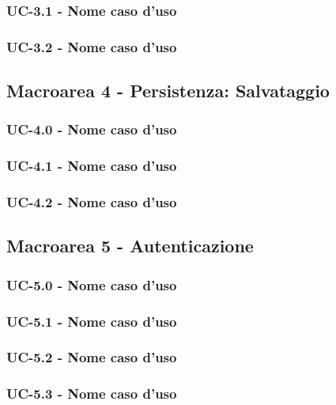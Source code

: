 \documentclass[11pt,a4paper]{article}
\begin{document}
\subsubsection{UC-3.1 - Nome caso d'uso}

\subsubsection{UC-3.2 - Nome caso d'uso}


\subsection{Macroarea 4 - Persistenza: Salvataggio}
\subsubsection{UC-4.0 - Nome caso d'uso}

\subsubsection{UC-4.1 - Nome caso d'uso}

\subsubsection{UC-4.2 - Nome caso d'uso}



\subsection{Macroarea 5 - Autenticazione}
\subsubsection{UC-5.0 - Nome caso d'uso}

\subsubsection{UC-5.1 - Nome caso d'uso}

\subsubsection{UC-5.2 - Nome caso d'uso}

\subsubsection{UC-5.3 - Nome caso d'uso}
\end{document}
